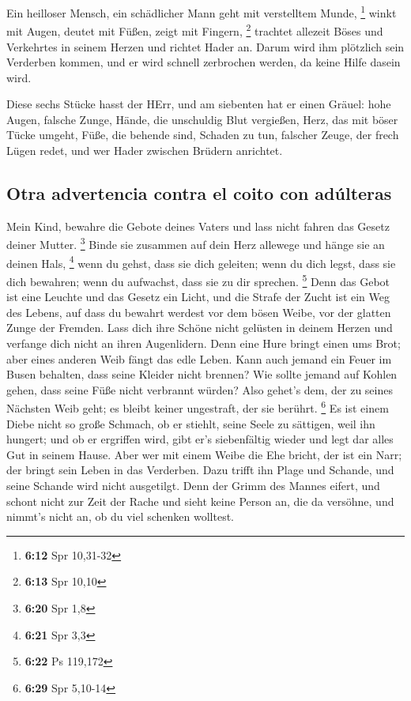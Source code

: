  Ein heilloser Mensch, ein schädlicher Mann geht mit
verstelltem Munde, \footnote{\textbf{6:12} Spr 10,31-32} 
winkt mit Augen, deutet mit Füßen, zeigt mit Fingern, \footnote{\textbf{6:13}
  Spr 10,10}  trachtet allezeit Böses und Verkehrtes in
seinem Herzen und richtet Hader an.  Darum wird ihm
plötzlich sein Verderben kommen, und er wird schnell zerbrochen werden,
da keine Hilfe dasein wird.

 Diese sechs Stücke hasst der HErr, und am siebenten hat
er einen Gräuel:  hohe Augen, falsche Zunge, Hände, die
unschuldig Blut vergießen,  Herz, das mit böser Tücke
umgeht, Füße, die behende sind, Schaden zu tun,  falscher
Zeuge, der frech Lügen redet, und wer Hader zwischen Brüdern anrichtet.

\hypertarget{otra-advertencia-contra-el-coito-con-aduxfalteras}{%
\subsection{Otra advertencia contra el coito con
adúlteras}\label{otra-advertencia-contra-el-coito-con-aduxfalteras}}

 Mein Kind, bewahre die Gebote deines Vaters und lass
nicht fahren das Gesetz deiner Mutter. \footnote{\textbf{6:20} Spr 1,8}
 Binde sie zusammen auf dein Herz allewege und hänge sie
an deinen Hals, \footnote{\textbf{6:21} Spr 3,3}  wenn du
gehst, dass sie dich geleiten; wenn du dich legst, dass sie dich
bewahren; wenn du aufwachst, dass sie zu dir sprechen. \footnote{\textbf{6:22}
  Ps 119,172}  Denn das Gebot ist eine Leuchte und das
Gesetz ein Licht, und die Strafe der Zucht ist ein Weg des Lebens,
 auf dass du bewahrt werdest vor dem bösen Weibe, vor der
glatten Zunge der Fremden.  Lass dich ihre Schöne nicht
gelüsten in deinem Herzen und verfange dich nicht an ihren Augenlidern.
 Denn eine Hure bringt einen ums Brot; aber eines anderen
Weib fängt das edle Leben.  Kann auch jemand ein Feuer im
Busen behalten, dass seine Kleider nicht brennen?  Wie
sollte jemand auf Kohlen gehen, dass seine Füße nicht verbrannt würden?
 Also gehet's dem, der zu seines Nächsten Weib geht; es
bleibt keiner ungestraft, der sie berührt. \footnote{\textbf{6:29} Spr
  5,10-14}  Es ist einem Diebe nicht so große Schmach, ob
er stiehlt, seine Seele zu sättigen, weil ihn hungert; 
und ob er ergriffen wird, gibt er's siebenfältig wieder und legt dar
alles Gut in seinem Hause.  Aber wer mit einem Weibe die
Ehe bricht, der ist ein Narr; der bringt sein Leben in das Verderben.
 Dazu trifft ihn Plage und Schande, und seine Schande
wird nicht ausgetilgt.  Denn der Grimm des Mannes eifert,
und schont nicht zur Zeit der Rache  und sieht keine
Person an, die da versöhne, und nimmt's nicht an, ob du viel schenken
wolltest.

